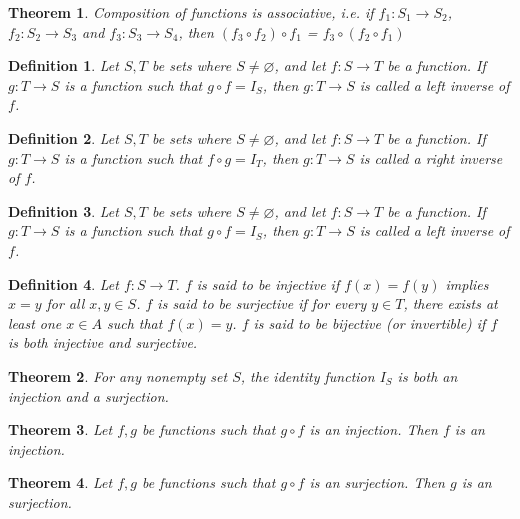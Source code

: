 \documentclass[a4paper]{article}
\newtheorem{mytheorem}{Theorem}
\newtheorem{mydef}{Definition}
\numberwithin{mytheorem}{section}
\numberwithin{mydef}{section}
\numberwithin{axiom}{section}
\numberwithin{example}{section}
\begin{document}
\begin{mytheorem} Composition of functions is associative, i.e. if $f_{1}: S_{1} \rightarrow S_{2}$, $f_{2}: S_{2} \rightarrow S_{3}$ and $f_{3}: S_{3} \rightarrow S_{4}$, then $(f_{3} \circ f_{2}) \circ f_{1}$ = $f_{3} \circ (f_{2} \circ f_{1})$
\end{mytheorem}

\begin{mydef} Let $S,T$ be sets where $S \neq \varnothing$, and let $f: S \rightarrow T$ be a function. If $g: T \rightarrow S$ is a function such that $g \circ f = I_{S}$, then $g: T \rightarrow S$ is called a left inverse of $f$. 
\end{mydef}

\begin{mydef} Let $S,T$ be sets where $S \neq \varnothing$, and let $f: S \rightarrow T$ be a function. If $g: T \rightarrow S$ is a function such that $f \circ g = I_{T}$, then $g: T \rightarrow S$ is called a right inverse of $f$. 
\end{mydef}

\begin{mydef} Let $S,T$ be sets where $S \neq \varnothing$, and let $f: S \rightarrow T$ be a function. If $g: T \rightarrow S$ is a function such that $g \circ f = I_{S}$, then $g: T \rightarrow S$ is called a left inverse of $f$. 
\end{mydef}

\begin{mydef} Let $f: S \rightarrow T$. $f$ is said to be injective if $f(x) = f(y)$ implies $x=y$ for all $x,y \in S$. $f$ is said to be surjective if for every $y \in T$, there exists at least one $x \in A$ such that $f(x) = y$. $f$ is said to be bijective (or invertible) if $f$ is both injective and surjective.
\end{mydef}

\begin{mytheorem} For any nonempty set $S$, the identity function $I_{S}$ is both an injection and a surjection.
\end{mytheorem}

\begin{mytheorem} Let $f,g$ be functions such that $g \circ f$ is an injection. Then $f$ is an injection.
\end{mytheorem}

\begin{mytheorem} Let $f,g$ be functions such that $g \circ f$ is an surjection. Then $g$ is an surjection.
\end{mytheorem}
\end{document}
